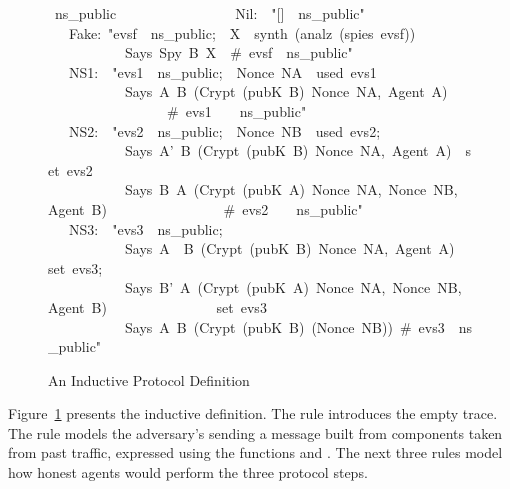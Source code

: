 \begin{figure}
\begin{isabelle}
\ ns_public\isanewline
\ \ \ \isanewline
\ \ \ \ \ \ \ \ \ \isanewline
\ \ \ Nil:\ \ "[]\ \isasymin \ ns_public"\isanewline
\isanewline
\ \ \ \ \ \ \ \ \ \isanewline
\ \ \ Fake:\ "\isasymlbrakk evsf\ \isasymin \ ns_public;\ \ X\ \isasymin \ synth\ (analz\ (spies\ evsf))\isasymrbrakk \isanewline
\ \ \ \ \ \ \ \ \ \ \isasymLongrightarrow \ Says\ Spy\ B\ X\ \ \#\ evsf\ \isasymin \ ns_public"\isanewline
\isanewline
\ \ \ \ \ \ \ \ \ \isanewline
\ \ \ NS1:\ \ "\isasymlbrakk evs1\ \isasymin \ ns_public;\ \ Nonce\ NA\ \isasymnotin \ used\ evs1\isasymrbrakk \isanewline
\ \ \ \ \ \ \ \ \ \ \isasymLongrightarrow \ Says\ A\ B\ (Crypt\ (pubK\ B)\ \isasymlbrace Nonce\ NA,\ Agent\ A\isasymrbrace )\isanewline
\ \ \ \ \ \ \ \ \ \ \ \ \ \ \ \ \ \#\ evs1\ \ \isasymin \ \ ns_public"\isanewline
\isanewline
\ \ \ \ \ \ \ \ \ \isanewline
\ \ \ NS2:\ \ "\isasymlbrakk evs2\ \isasymin \ ns_public;\ \ Nonce\ NB\ \isasymnotin \ used\ evs2;\isanewline
\ \ \ \ \ \ \ \ \ \ \ Says\ A'\ B\ (Crypt\ (pubK\ B)\ \isasymlbrace Nonce\ NA,\ Agent\ A\isasymrbrace )\ \isasymin \ set\ evs2\isasymrbrakk \isanewline
\ \ \ \ \ \ \ \ \ \ \isasymLongrightarrow \ Says\ B\ A\ (Crypt\ (pubK\ A)\ \isasymlbrace Nonce\ NA,\ Nonce\ NB,\ Agent\ B\isasymrbrace )\isanewline
\ \ \ \ \ \ \ \ \ \ \ \ \ \ \ \ \#\ evs2\ \ \isasymin \ \ ns_public"\isanewline
\isanewline
\ \ \ \ \ \ \ \ \ \isanewline
\ \ \ NS3:\ \ "\isasymlbrakk evs3\ \isasymin \ ns_public;\isanewline
\ \ \ \ \ \ \ \ \ \ \ Says\ A\ \ B\ (Crypt\ (pubK\ B)\ \isasymlbrace Nonce\ NA,\ Agent\ A\isasymrbrace )\ \isasymin \ set\ evs3;\isanewline
\ \ \ \ \ \ \ \ \ \ \ Says\ B'\ A\ (Crypt\ (pubK\ A)\ \isasymlbrace Nonce\ NA,\ Nonce\ NB,\ Agent\ B\isasymrbrace )\isanewline
\ \ \ \ \ \ \ \ \ \ \ \ \ \ \isasymin \ set\ evs3\isasymrbrakk \isanewline
\ \ \ \ \ \ \ \ \ \ \isasymLongrightarrow \ Says\ A\ B\ (Crypt\ (pubK\ B)\ (Nonce\ NB))\ \#\ evs3\ \isasymin \
ns_public"
\end{isabelle}
\caption{An Inductive Protocol Definition}\label{fig:ns_public}
\end{figure}

Figure~\ref{fig:ns_public} presents the inductive definition.  The
\isa{Nil} rule introduces the empty trace.  The \isa{Fake} rule models the
adversary's sending a message built from components taken from past
traffic, expressed using the functions \isa{synth} and
. 
The next three rules model how honest agents would perform the three
protocol steps.  

